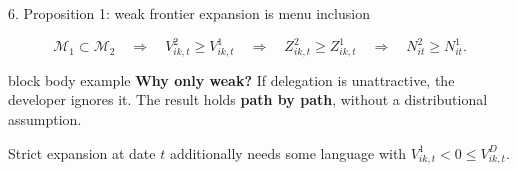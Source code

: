 \documentclass[aspectratio=169,10pt]{beamer}
\begin{document}
\begin{frame}{6. Proposition 1: weak frontier expansion is menu inclusion}
  \vspace{0.12cm}
  \begin{center}
  \end{center}

  \[
    \mathcal M_1\subset\mathcal M_2
    \quad\Longrightarrow\quad
    V^2_{ik,t}\ge V^1_{ik,t}
    \quad\Longrightarrow\quad
    Z^2_{ik,t}\ge Z^1_{ik,t}
    \quad\Longrightarrow\quad
    N^2_{it}\ge N^1_{it}.
  \]

  \begin{beamercolorbox}[wd=\textwidth,sep=0.18cm,rounded=true]{block body example}
    \textbf{Why only weak?} If delegation is unattractive, the developer ignores it. The result holds \textbf{path by path}, without a distributional assumption.
  \end{beamercolorbox}

  \vspace{0.20cm}
  \centering\small
  Strict expansion at date $t$ additionally needs some language with
  $V^1_{ik,t}<0\le V^D_{ik,t}$.
\end{frame}
\end{document}
